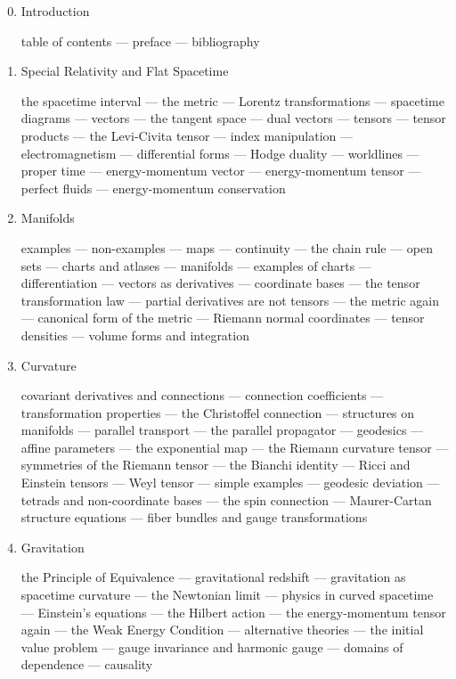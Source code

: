 \begin{enumerate}
\setcounter{enumi}{-1}

\item{Introduction}

table of contents --- preface --- bibliography

\item{Special Relativity and Flat Spacetime}

the spacetime interval --- the metric --- Lorentz transformations ---
  spacetime diagrams --- vectors --- the tangent space ---
  dual vectors --- tensors --- tensor products --- the Levi-Civita
  tensor --- index manipulation --- electromagnetism ---
  differential forms --- Hodge duality --- worldlines --- proper time ---
  energy-momentum vector --- energy-momentum tensor --- perfect fluids
  --- energy-momentum conservation

\item{Manifolds}

examples --- non-examples --- maps --- continuity --- the chain rule ---
  open sets --- charts and atlases --- manifolds --- examples of charts ---
  differentiation --- vectors as derivatives --- coordinate bases ---
  the tensor transformation law --- partial derivatives are not tensors --- 
  the metric again --- canonical form of the metric --- Riemann normal 
  coordinates --- tensor densities --- volume forms and integration

\item{Curvature}

covariant derivatives and connections --- connection coefficients
  --- transformation properties --- the Christoffel connection --- 
  structures on manifolds --- parallel transport --- the parallel 
  propagator --- geodesics --- affine parameters --- the exponential
  map --- the Riemann curvature tensor --- symmetries of the Riemann
  tensor --- the Bianchi identity --- Ricci and Einstein tensors ---
  Weyl tensor --- simple examples --- geodesic deviation --- tetrads
  and non-coordinate bases --- the spin connection --- Maurer-Cartan
  structure equations --- fiber bundles and gauge transformations

\item{Gravitation}

the Principle of Equivalence --- gravitational redshift ---
  gravitation as spacetime curvature --- the Newtonian limit ---
  physics in curved spacetime --- Einstein's equations --- the Hilbert
  action --- the energy-momentum tensor again --- the Weak Energy
  Condition --- alternative theories --- the initial value problem ---
  gauge invariance and harmonic gauge --- domains of dependence ---
  causality


\end{enumerate}
